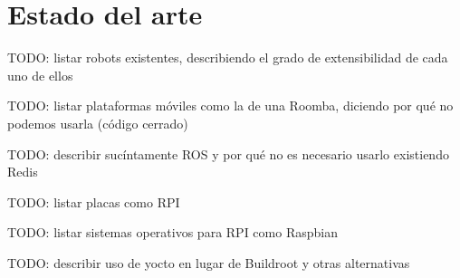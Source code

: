 \chapter{Estado del arte}

TODO: listar robots existentes, describiendo el grado de extensibilidad de cada uno de ellos

TODO: listar plataformas móviles como la de una Roomba, diciendo por qué no podemos usarla (código cerrado)

TODO: describir sucíntamente ROS y por qué no es necesario usarlo existiendo Redis

TODO: listar placas como RPI

TODO: listar sistemas operativos para RPI como Raspbian

TODO: describir uso de yocto en lugar de Buildroot y otras alternativas